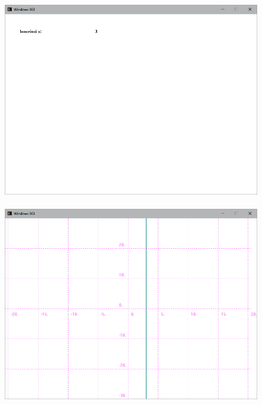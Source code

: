 \documentclass[12pt]{book}
\begin{document}
		\begin{figure}[h]
			\includegraphics[scale=0.5]{tracciarettavertterminale1}
			\\ \\
			\includegraphics[scale=0.5]{tracciarettavertterminale2}
		\end{figure}
		\clearpage
		\newpage
\end{document}
